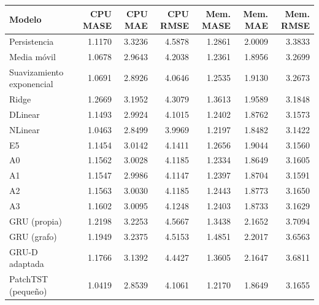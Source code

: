 \begin{tabular}{lrrrrrr}
\toprule
Modelo & CPU MASE & CPU MAE & CPU RMSE & Mem. MASE & Mem. MAE & Mem. RMSE \\
\midrule
Persistencia & 1.1170 & 3.3236 & 4.5878 & 1.2861 & 2.0009 & 3.3833 \\
Media móvil & 1.0678 & 2.9643 & 4.2038 & 1.2361 & 1.8956 & 3.2699 \\
Suavizamiento exponencial & 1.0691 & 2.8926 & 4.0646 & 1.2535 & 1.9130 & 3.2673 \\
Ridge & 1.2669 & 3.1952 & 4.3079 & 1.3613 & 1.9589 & 3.1848 \\
DLinear & 1.1493 & 2.9924 & 4.1015 & 1.2402 & 1.8762 & 3.1573 \\
NLinear & 1.0463 & 2.8499 & 3.9969 & 1.2197 & 1.8482 & 3.1422 \\
E5 & 1.1454 & 3.0142 & 4.1411 & 1.2656 & 1.9044 & 3.1560 \\
A0 & 1.1562 & 3.0028 & 4.1185 & 1.2334 & 1.8649 & 3.1605 \\
A1 & 1.1547 & 2.9986 & 4.1147 & 1.2397 & 1.8704 & 3.1591 \\
A2 & 1.1563 & 3.0030 & 4.1185 & 1.2443 & 1.8773 & 3.1650 \\
A3 & 1.1602 & 3.0095 & 4.1248 & 1.2403 & 1.8733 & 3.1629 \\
GRU (propia) & 1.2198 & 3.2253 & 4.5667 & 1.3438 & 2.1652 & 3.7094 \\
GRU (grafo) & 1.1949 & 3.2375 & 4.5153 & 1.4851 & 2.2017 & 3.6563 \\
GRU-D adaptada & 1.1766 & 3.1392 & 4.4427 & 1.3605 & 2.1647 & 3.6811 \\
PatchTST (pequeño) & 1.0419 & 2.8539 & 4.1061 & 1.2170 & 1.8649 & 3.1655 \\
\bottomrule
\end{tabular}
